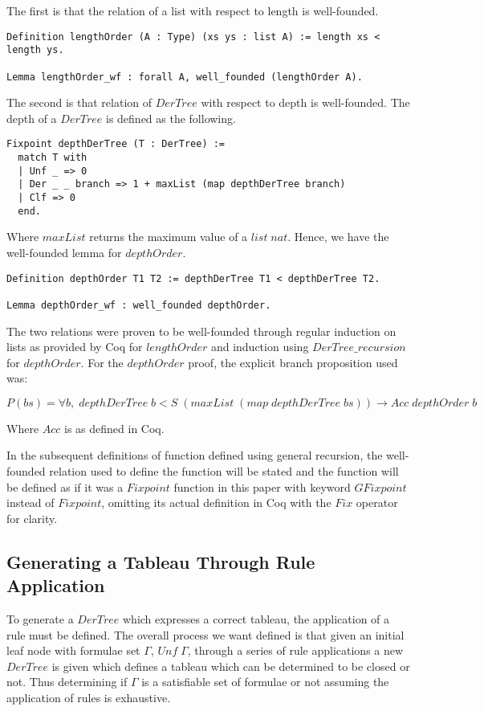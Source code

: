 \documentclass{article}
\begin{document}
The first is that the relation of a list with respect to length is
well-founded.

\begin{lstlisting}
Definition lengthOrder (A : Type) (xs ys : list A) := length xs < length ys.

Lemma lengthOrder_wf : forall A, well_founded (lengthOrder A).
\end{lstlisting}

The second is that relation of $DerTree$ with respect to depth is well-founded.
The depth of a $DerTree$ is defined as the following.

\begin{lstlisting}
Fixpoint depthDerTree (T : DerTree) :=
  match T with
  | Unf _ => 0
  | Der _ _ branch => 1 + maxList (map depthDerTree branch)
  | Clf => 0
  end.
\end{lstlisting}

Where $maxList$ returns the maximum value of a $list\;nat$. Hence, we have the
well-founded lemma for $depthOrder$.

\begin{lstlisting}
Definition depthOrder T1 T2 := depthDerTree T1 < depthDerTree T2.

Lemma depthOrder_wf : well_founded depthOrder.
\end{lstlisting}

The two relations were proven to be well-founded through regular induction on
lists as provided by Coq for $lengthOrder$ and induction using
$DerTree\_recursion$ for $depthOrder$. For the $depthOrder$ proof, the explicit
branch proposition used was:

$$P(bs) = \forall b,\; depthDerTree\; b < S\;(maxList\; (map\; depthDerTree
\;bs)) \rightarrow Acc\; depthOrder\; b$$

Where $Acc$ is as defined in Coq.

In the subsequent definitions of function defined using general recursion, the 
well-founded relation used to define the function will be stated and the
function will be defined as if it was a $Fixpoint$ function in this paper with
keyword $GFixpoint$ instead of $Fixpoint$, omitting its actual definition in
Coq with the $Fix$ operator for clarity.

\subsection{Generating a Tableau Through Rule Application}

To generate a $DerTree$ which expresses a correct tableau, the application of
a rule must be defined. The overall process we want defined is that given an
initial leaf node with formulae set $\Gamma$, $Unf\; \Gamma$, through a series
of rule applications a new $DerTree$ is given which defines a tableau which can
be determined to be closed or not. Thus determining if $\Gamma$ is a
satisfiable set of formulae or not assuming the application of rules is
exhaustive.
\end{document}
